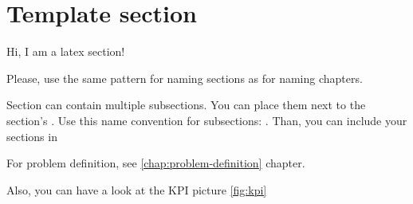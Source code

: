 \section{Template section}
\label{sec:template-section}


Hi, I am a latex section!

Please, use the same pattern for naming sections as for naming chapters.

Section can contain multiple subsections. You can place them next to the
section's . Use this name convention for subsections:
. Than, you can include your
sections in 

For problem definition, see \ref{chap:problem-definition} chapter.

Also, you can have a look at the KPI picture \ref{fig:kpi}



